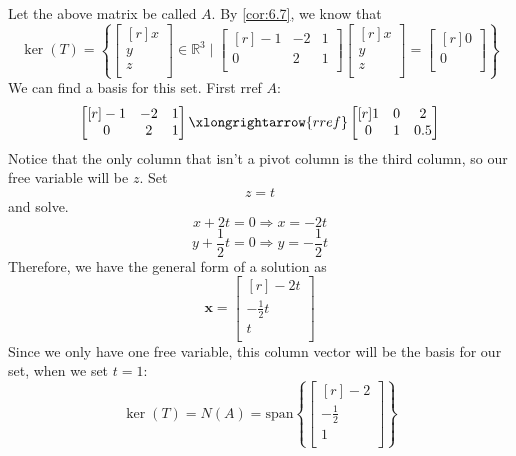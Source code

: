 \begin{solution}
    Let the above matrix be called \(A\). By \ref{cor:6.7}, we know that
    \[
        \ker (T)=\left\{ \begin{bmatrix}[r]
             x \\
             y \\
             z \\
        \end{bmatrix}\in\mathbb{R}^3 \mid \begin{bmatrix}[r]
            -1 &-2  &1   \\
             0&  2&   1\\
        \end{bmatrix} \begin{bmatrix}[r]
            x \\
            y \\
            z \\
       \end{bmatrix}=\begin{bmatrix}[r]
         0 \\
         0 \\
       \end{bmatrix} \right\} 
    \]
    We can find a basis for this set. First rref \(A\):
    \[
        \begin{bmatrix}[r]
            -1 &-2  &1   \\
             0&  2&   1\\
        \end{bmatrix}\xlongrightarrow{rref} \begin{bmatrix}[r]
            1 &0  &2   \\
             0&1  &0.5   \\
        \end{bmatrix}
    \]
    Notice that the only column that isn't a pivot column is the third column, so our free variable will be \(z\). Set 
    \[
        z=t
    \]
    and solve. 
    \[
        x+2t = 0 \Longrightarrow  x=-2t
    \]
    \[
        y+\frac{1}{2}t=0 \Longrightarrow y=-\frac{1}{2}t
    \]
    Therefore, we have the general form of a solution as
    \[
        \mathbf{x}=\begin{bmatrix}[r]
             -2t \\
             -\frac{1}{2}t \\
              t\\
        \end{bmatrix}
    \]
    Since we only have one free variable, this column vector will be the basis for our set, when we set \(t=1\):
    \[
        \ker (T)=N(A)= \text{span} \left\{ \begin{bmatrix}[r]
             -2 \\
             -\frac{1}{2} \\
              1\\
        \end{bmatrix} \right\} 
    \]
\end{solution}
